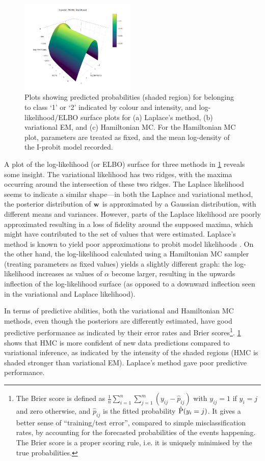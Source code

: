 \begin{figure}[p]
  \includegraphics[width=0.49\textwidth]{figure/05-lik_hmc}
  \caption[Predicted probabilities and log-density plots]{Plots showing predicted probabilities (shaded region) for belonging to class `1' or `2' indicated by colour and intensity, and log-likelihood/ELBO surface plots for (a) Laplace's method, (b) variational EM, and (c) Hamiltonian MC. For the Hamiltonian MC plot, parameters are treated as fixed, and the mean log-density of the I-probit model recorded.}
  \label{fig:exampleiprobitfit}
\end{figure}

A plot of the log-likelihood (or ELBO) surface for three methods in \cref{fig:exampleiprobitfit} reveals some insight.
The variational likelihood has two ridges, with the maxima occurring around the intersection of these two ridges.
The Laplace likelihood seems to indicate a similar shape---in both the Laplace and variational method, the posterior distribution of ${\mathbf w}$ is approximated by a Gaussian distribution, with different means and variances.
However, parts of the Laplace likelihood are poorly approximated resulting in a loss of fidelity around the supposed maxima, which might have contributed to the set of values that were estimated.
Laplace's method is known to yield poor approximations to probit model likelihoods \citep{kuss2005assessing}.
On the other hand, the log-likelihood calculated using a Hamiltonian MC sampler (treating parameters as fixed values) yields a slightly different graph: the log-likelihood increases as values of $\alpha$ become larger, resulting in the upwards inflection of the log-likelihood surface (as opposed to a downward inflection seen in the variational and Laplace likelihood).

In terms of predictive abilities, both the variational and Hamiltonian MC methods, even though the posteriors are differently estimated, have good predictive performance as indicated by their error rates and Brier scores\footnote{The Brier score is defined as $\frac{1}{n}\sum_{i=1}^n\sum_{j=1}^m (y_{ij} - \hat p_{ij})$ with $y_{ij}=1$ if $y_i = j$ and zero otherwise, and $\hat p_{ij}$ is the fitted probability $\hat{\operatorname{P}}(y_i = j)$. It gives a better sense of ``training/test error'', compared to simple misclassification rates, by accounting for the forecasted probabilities of the events happening. The Brier score is a proper scoring rule, i.e. it is uniquely minimised by the true probabilities.}.
\cref{fig:exampleiprobitfit} shows that HMC is more confident of new data predictions compared to variational inference, as indicated by the intensity of the shaded regions (HMC is shaded stronger than variational EM).
Laplace's method gave poor predictive performance.

